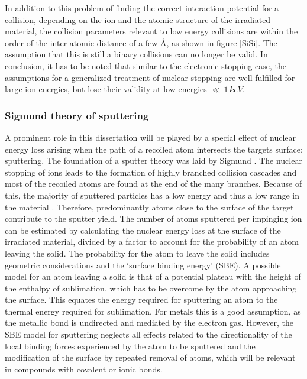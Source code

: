 In addition to this problem of finding the correct interaction potential for a collision, depending on the ion and the atomic structure of the irradiated material, the collision parameters relevant to low energy collisions are within the order of the inter-atomic distance of a few \AA, as shown in figure \ref{SiSi}. The assumption that this is still a binary collisions can no longer be valid. In conclusion, it has to be noted that similar to the electronic stopping case, the assumptions for a generalized treatment of nuclear stopping are well fulfilled for large ion energies, but lose their validity at low energies $\ll\,1\,keV$.

\subsubsection{Sigmund theory of sputtering}

A prominent role in this dissertation will be played by a special effect of nuclear energy loss arising when the path of a recoiled atom intersects the targets surface: sputtering. The foundation of a sputter theory was laid by Sigmund \cite{sigmund_theory_1969}. The nuclear stopping of ions leads to the formation of highly branched collision cascades and most of the recoiled atoms are found at the end of the many branches. Because of this, the majority of sputtered particles has a low energy and thus a low range in the material \cite{thompson_energy_1968}. Therefore, predominantly atoms close to the surface of the target contribute to the sputter yield. The number of atoms sputtered per impinging ion can be estimated by calculating the nuclear energy loss at the surface of the irradiated material, divided by a factor to account for the probability of an atom leaving the solid. The probability for the atom to leave the solid includes geometric considerations and the `surface binding energy' (SBE). A possible model for an atom leaving a solid is that of a potential plateau with the height of the enthalpy of sublimation, which has to be overcome by the atom approaching the surface. This equates the energy required for sputtering an atom to the thermal energy required for sublimation. For metals this is a good assumption, as the metallic bond is undirected and mediated by the electron gas. However, the SBE model for sputtering neglects all effects related to the directionality of the local binding forces experienced by the atom to be sputtered and the modification of the surface by repeated removal of atoms, which will be relevant in compounds with covalent or ionic bonds.  


